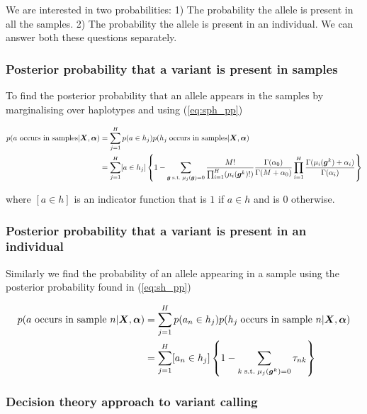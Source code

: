 \documentclass{article}
\begin{document}
We are interested in two probabilities: 1) The probability the allele is present in all the samples. 2) The probability the allele is present in an individual. We can answer both these questions separately.

\subsubsection{Posterior probability that a variant is present in samples}

To find the posterior probability that an allele appears in the samples by marginalising over haplotypes and using (\ref{eq:sph_pp})

\begin{align}
\label{eq:spa_pp}
    p(a \text{ occurs in samples}| \boldsymbol{X}, \boldsymbol{\alpha}) &= \sum_{j = 1}^H p(a \in h_j) p(h_j \; \text{occurs in samples}| \boldsymbol{X}, \boldsymbol{\alpha}) \notag \\
    &= \sum_{j = 1}^H [a \in h_j] \left\{ 1 -  \sum_{\boldsymbol{g} \; \text{s.t.} \; \mu_j(\boldsymbol{g}) = 0} \frac{M!}{\prod_{i = 1}^{H} (\mu_i(\boldsymbol{g}^k)!)} \frac{\Gamma(\alpha_0)}{\Gamma(M + \alpha_0)} \prod_{i = 1}^H \frac{\Gamma(\mu_i(\boldsymbol{g}^k) + \alpha_i)}{\Gamma(\alpha_i)} \right\}
\end{align}

where $[a \in h]$ is an indicator function that is $1$ if $a \in h$ and is $0$ otherwise.

\subsubsection{Posterior probability that a variant is present in an individual}

Similarly we find the probability of an allele appearing in a sample using the posterior probability found in (\ref{eq:sh_pp})

\begin{align}
\label{eq:sa_pp}
    p(a \text{ occurs in sample } n | \boldsymbol{X}, \boldsymbol{\alpha}) &=  \sum_{j = 1}^H p(a_n \in h_j) p(h_j \; \text{occurs in sample } n | \boldsymbol{X}, \boldsymbol{\alpha}) \notag \\
    &= \sum_{j = 1}^H [a_n \in h_j] \left\{ 1 - \sum_{k \; \text{s.t.} \; \mu_j(\boldsymbol{g}^k) = 0} \tau_{nk} \right\}
\end{align}

\subsubsection{Decision theory approach to variant calling}
\end{document}
